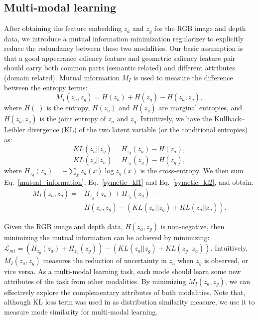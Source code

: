 \documentclass[10pt,twocolumn,letterpaper]{article}
\begin{document}
\subsection{Multi-modal learning}
\label{sub_sec_complementary}
After obtaining the feature embedding $z_a$ and $z_g$ for the
RGB image and depth data, we introduce a
mutual information minimization regularizer to explicitly reduce the redundancy between
these two modalities. Our basic assumption is that a good appearance saliency feature and geometric saliency feature pair should carry both common parts (semantic related) and different attributes (domain related). 
Mutual information $M_I$ is used to measure the difference between
the entropy terms:
\begin{equation}
\label{mutual_information}
    M_I(z_a,z_g) = H(z_a) + H(z_g) - H(z_a, z_g),
\end{equation}
where $H(.)$ is the entropy, $H(z_a)$ and $H(z_g)$ are marginal entropies, and $H(z_a, z_g)$ is the joint entropy of $z_a$ and $z_g$. Intuitively, we have the Kullback–Leibler divergence (KL) of the two latent variable (or the conditional entropies) as:
\begin{equation}
\label{symetic_kl1}
    KL(z_a||z_g) = H_{z_g}(z_a) - H(z_a),
\end{equation}
\begin{equation}
\label{symetic_kl2}
    KL(z_g||z_a) = H_{z_a}(z_g) - H(z_g),
\end{equation}
where $H_{z_g}(z_a)=-\sum_x z_a(x)\log z_g(x)$ is the cross-entropy.
We then sum Eq.~\ref{mutual_information}, Eq.~\ref{symetic_kl1} and Eq.~\ref{symetic_kl2}, and obtain:
\begin{equation}
\label{mutual_infor_kl}
\begin{aligned}
     M_I(z_a,z_g) = & H_{z_g}(z_a) + H_{z_a}(z_g) - \\
    & H(z_a, z_g) - (KL(z_a||z_g) + KL(z_g||z_a)).
\end{aligned}
\end{equation}

Given the RGB image and depth data, $H(z_a, z_g)$ is non-negative, then
minimizing the mutual information can be achieved by minimizing:
$\mathcal{L}_{mi}=(H_{z_g}(z_a) + H_{z_a}(z_g))-(KL(z_a||z_g) + KL(z_g||z_a))$.
Intuitively,
$M_I(z_a,z_g)$ measures the reduction of uncertainty in $z_a$ when $z_g$ is observed, or vice versa. As a multi-modal learning task, each mode should learn some new attributes of the task from other modalities. By minimizing $M_I(z_a,z_g)$, we can effectively explore the complementary attributes of both modalities.
Note that, although KL loss term was used in \cite{jing2020uc} as distribution similarity measure,
we use it to measure mode similarity for multi-modal learning.
\end{document}
